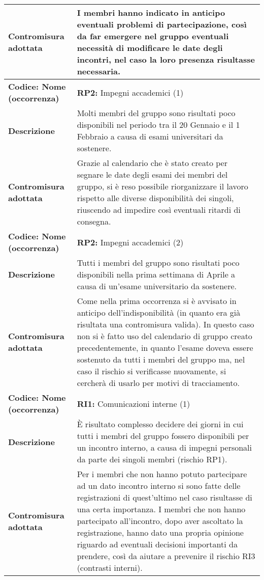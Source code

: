 {\begin{longtable}{C{3.5cm} | C{11cm}}
\textbf{Contromisura adottata} & I membri hanno indicato in anticipo eventuali problemi di partecipazione, così da far emergere nel gruppo eventuali necessità di modificare le date degli incontri, nel caso la loro presenza risultasse necessaria.\\
\hline
{}\textbf{Codice: Nome (occorrenza)} & \textbf{RP2: }{Impegni accademici (1)}\\ 
\textbf{Descrizione} & Molti membri del gruppo sono risultati poco disponibili nel periodo tra il 20 Gennaio e il 1 Febbraio a causa di esami universitari da sostenere.\\
\textbf{Contromisura adottata} & Grazie al calendario che è stato creato per segnare le date degli esami dei membri del gruppo, si è reso possibile riorganizzare il lavoro rispetto alle diverse disponibilità dei singoli, riuscendo ad impedire così eventuali ritardi di consegna.\\
\hline
\hline
{}\textbf{Codice: Nome (occorrenza)} & \textbf{RP2: }{Impegni accademici (2)}\\ 
\textbf{Descrizione} & Tutti i membri del gruppo sono risultati poco disponibili nella prima settimana di Aprile a causa di un'esame universitario da sostenere.\\
\textbf{Contromisura adottata} & Come nella prima occorrenza si è avvisato in anticipo dell'indisponibilità (in quanto era già risultata una contromisura valida). 
In questo caso non si è fatto uso del calendario di gruppo creato precedentemente, in quanto l'esame doveva essere sostenuto da tutti i membri del gruppo ma, nel caso il rischio si verificasse nuovamente, si cercherà di usarlo per motivi di tracciamento.\\
\hline
{}\textbf{Codice: Nome (occorrenza)} & \textbf{RI1: }{Comunicazioni interne (1)}\\
\textbf{Descrizione} & È risultato complesso decidere dei giorni in cui tutti i membri del gruppo fossero disponibili per un incontro interno, a causa di impegni personali da parte dei singoli membri (rischio RP1).\\ 
\textbf{Contromisura adottata} & Per i membri che non hanno potuto partecipare ad un dato incontro interno si sono fatte delle registrazioni di quest'ultimo nel caso risultasse di una certa importanza. I membri che non hanno partecipato all'incontro, dopo aver ascoltato la registrazione, hanno dato una propria opinione riguardo ad eventuali decisioni importanti da prendere, così da aiutare a prevenire il rischio RI3 (contrasti interni).\\

\end{longtable}}
